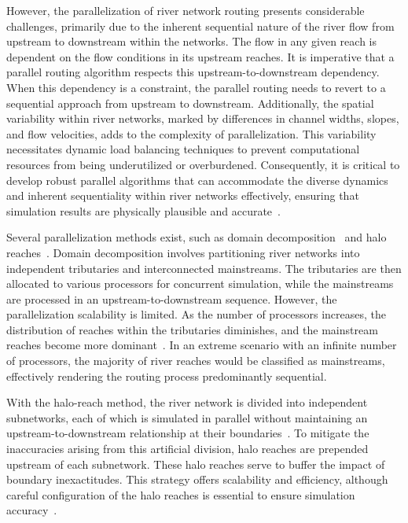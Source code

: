 \documentclass[water,article,submit,pdftex,moreauthors]{Definitions/mdpi}
\begin{document}
However, the parallelization of river network routing presents considerable challenges, primarily due to the inherent sequential nature of the river flow from upstream to downstream within the networks. The flow in any given reach is dependent on the flow conditions in its upstream reaches. It is imperative that a parallel routing algorithm respects this upstream-to-downstream dependency. When this dependency is a constraint, the parallel routing needs to revert to a sequential approach from upstream to downstream. Additionally, the spatial variability within river networks, marked by differences in channel widths, slopes, and flow velocities, adds to the complexity of parallelization. This variability necessitates dynamic load balancing techniques to prevent computational resources from being underutilized or overburdened. Consequently, it is critical to develop robust parallel algorithms that can accommodate the diverse dynamics and inherent sequentiality within river networks effectively, ensuring that simulation results are physically plausible and accurate~\cite{david2013WRR, mizukami2021JAMES, liu2014EMS, liu2023JH}.

Several parallelization methods exist, such as domain decomposition~\cite{mizukami2021JAMES, liu2023JH} and halo reaches~\cite{david2013WRR}. Domain decomposition involves partitioning river networks into independent tributaries and interconnected mainstreams. The tributaries are then allocated to various processors for concurrent simulation, while the mainstreams are processed in an upstream-to-downstream sequence. However, the parallelization scalability is limited. As the number of processors increases, the distribution of reaches within the tributaries diminishes, and the mainstream reaches become more dominant~\cite{mizukami2021JAMES}. In an extreme scenario with an infinite number of processors, the majority of river reaches would be classified as mainstreams, effectively rendering the routing process predominantly sequential.

With the halo-reach method, the river network is divided into independent subnetworks, each of which is simulated in parallel without maintaining an upstream-to-downstream relationship at their boundaries~\cite{david2015WRR}. To mitigate the inaccuracies arising from this artificial division, halo reaches are prepended upstream of each subnetwork. These halo reaches serve to buffer the impact of boundary inexactitudes. This strategy offers scalability and efficiency, although careful configuration of the halo reaches is essential to ensure simulation accuracy~\cite{david2013WRR}.
\end{document}
